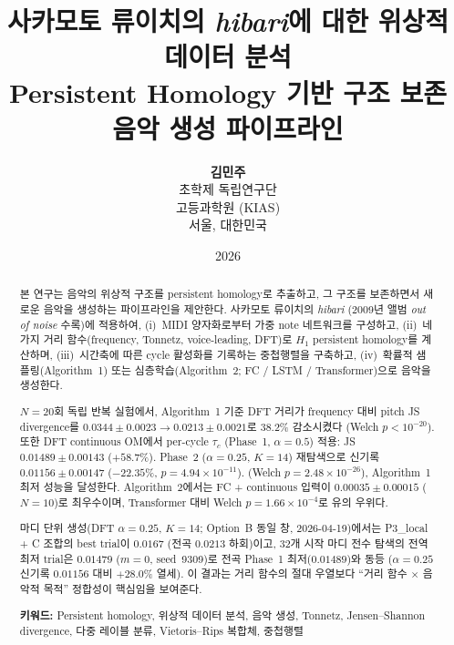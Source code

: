 \documentclass[11pt,a4paper]{article}
\title{%
\vspace{-1cm}
{\LARGE\bfseries
사카모토 류이치의 \emph{hibari}에 대한 위상적 데이터 분석}\\[0.4cm]
{\Large Persistent Homology 기반 구조 보존 음악 생성 파이프라인}
}
\author{%
\textbf{김민주}\\[0.2cm]
초학제 독립연구단\\
고등과학원 (KIAS)\\
서울, 대한민국
}
\date{2026}
\begin{document}
\maketitle
\thispagestyle{empty}

\begin{abstract}
\noindent
본 연구는 음악의 위상적 구조를 persistent homology로 추출하고,
그 구조를 보존하면서 새로운 음악을 생성하는 파이프라인을 제안한다.
사카모토 류이치의 \emph{hibari} (2009년 앨범 \emph{out of noise} 수록)에
적용하여, (i)~MIDI 양자화로부터 가중 note 네트워크를 구성하고,
(ii)~네 가지 거리 함수(frequency, Tonnetz, voice-leading, DFT)로
$H_1$ persistent homology를 계산하며,
(iii)~시간축에 따른 cycle 활성화를 기록하는 중첩행렬을 구축하고,
(iv)~확률적 샘플링(Algorithm~1) 또는 심층학습(Algorithm~2; FC / LSTM /
Transformer)으로 음악을 생성한다.

$N=20$회 독립 반복 실험에서, Algorithm~1 기준 DFT 거리가
frequency 대비 pitch JS divergence를
$0.0344 \pm 0.0023 \to 0.0213 \pm 0.0021$로
$38.2\%$ 감소시켰다 (Welch $p < 10^{-20}$).
또한 DFT continuous OM에서 per-cycle $\tau_c$ (Phase~1, $\alpha=0.5$) 적용: JS $0.01489 \pm 0.00143$ ($+58.7\%$).
Phase~2 ($\alpha=0.25$, $K=14$) 재탐색으로 신기록 $\mathbf{0.01156 \pm 0.00147}$
($-22.35\%$, $p=4.94\times10^{-11}$).
(Welch $p = 2.48 \times 10^{-26}$), Algorithm~1 최저 성능을 달성한다.
Algorithm~2에서는 FC + continuous 입력이
$\mathbf{0.00035 \pm 0.00015}$ ($N=10$)로 최우수이며,
Transformer 대비 Welch $p = 1.66 \times 10^{-4}$로 유의 우위다.

마디 단위 생성(DFT $\alpha=0.25$, $K=14$; Option~B 동일 창, 2026-04-19)에서는
P3\_local + C 조합의 best trial이 $\mathbf{0.0167}$ (전곡 $0.0213$ 하회)이고,
32개 시작 마디 전수 탐색의 전역 최저 trial은
$\mathbf{0.01479}$ ($m=0$, seed~9309)로 전곡 Phase~1 최저($0.01489$)와 동등 ($\alpha=0.25$ 신기록 $0.01156$ 대비 $+28.0\%$ 열세).
이 결과는 거리 함수의 절대 우열보다
``거리 함수 $\times$ 음악적 목적'' 정합성이 핵심임을 보여준다.

\medskip
\noindent\textbf{키워드:}
Persistent homology, 위상적 데이터 분석, 음악 생성,
Tonnetz, Jensen--Shannon divergence, 다중 레이블 분류,
Vietoris--Rips 복합체, 중첩행렬
\end{abstract}

\newpage
\tableofcontents
\newpage

\end{document}
